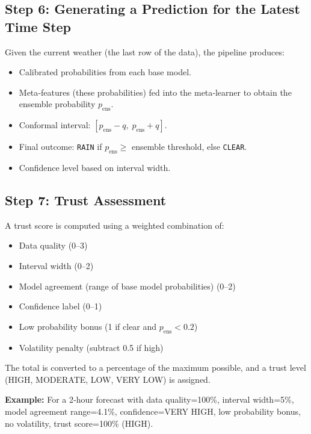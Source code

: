 \documentclass[12pt]{article}
\begin{document}
	\subsection{Step 6: Generating a Prediction for the Latest Time Step}
	Given the current weather (the last row of the data), the pipeline produces:
	\begin{itemize}
		\item Calibrated probabilities from each base model.
		\item Meta‑features (these probabilities) fed into the meta‑learner to obtain the ensemble probability $p_{\text{ens}}$.
		\item Conformal interval: $[p_{\text{ens}}-q,\;p_{\text{ens}}+q]$.
		\item Final outcome: \texttt{RAIN} if $p_{\text{ens}} \ge$ ensemble threshold, else \texttt{CLEAR}.
		\item Confidence level based on interval width.
	\end{itemize}
	
	\subsection{Step 7: Trust Assessment}
	A trust score is computed using a weighted combination of:
	\begin{itemize}
		\item Data quality (0–3)
		\item Interval width (0–2)
		\item Model agreement (range of base model probabilities) (0–2)
		\item Confidence label (0–1)
		\item Low probability bonus (1 if clear and $p_{\text{ens}}<0.2$)
		\item Volatility penalty (subtract 0.5 if high)
	\end{itemize}
	The total is converted to a percentage of the maximum possible, and a trust level (HIGH, MODERATE, LOW, VERY LOW) is assigned.
	
	\textbf{Example:} For a 2‑hour forecast with data quality=100\%, interval width=5\%, model agreement range=4.1\%, confidence=VERY HIGH, low probability bonus, no volatility, trust score=100\% (HIGH).
	
\end{document}

